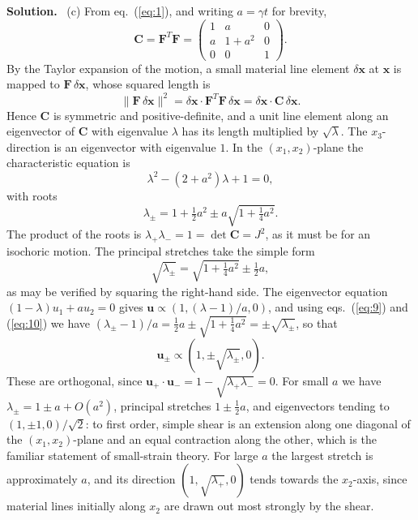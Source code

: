 \documentclass[a4paper,12pt]{paper}
\newenvironment{solution}{\par\noindent\textbf{Solution.}\ }{\par\medskip}
\begin{document}
\begin{solution}
(c) From eq.~(\ref{eq:1}), and writing $a=\gamma t$ for brevity,
\begin{equation}
\mathbf{C}=\mathbf{F}^{T}\mathbf{F}=\begin{pmatrix}1&a&0\\a&1+a^{2}&0\\0&0&1\end{pmatrix}.
\label{eq:6}
\end{equation}
By the Taylor expansion of the motion, a small material line element $\delta\mathbf{x}$ at
$\mathbf{x}$ is mapped to $\mathbf{F}\,\delta\mathbf{x}$, whose squared length is
\begin{equation}
\|\mathbf{F}\,\delta\mathbf{x}\|^{2}=\delta\mathbf{x}\cdot\mathbf{F}^{T}\mathbf{F}\,\delta\mathbf{x}
=\delta\mathbf{x}\cdot\mathbf{C}\,\delta\mathbf{x}.
\label{eq:7}
\end{equation}
Hence $\mathbf{C}$ is symmetric and positive-definite, and a unit line element along an
eigenvector of $\mathbf{C}$ with eigenvalue $\lambda$ has its length multiplied by
$\sqrt{\lambda}$. The $x_{3}$-direction is an eigenvector with eigenvalue $1$. In the
$(x_{1},x_{2})$-plane the characteristic equation is
\begin{equation}
\lambda^{2}-(2+a^{2})\lambda+1=0,
\label{eq:8}
\end{equation}
with roots
\begin{equation}
\lambda_{\pm}=1+\tfrac{1}{2}a^{2}\pm a\sqrt{1+\tfrac{1}{4}a^{2}}.
\label{eq:9}
\end{equation}
The product of the roots is $\lambda_{+}\lambda_{-}=1=\det\mathbf{C}=J^{2}$, as it must be for
an isochoric motion. The principal stretches take the simple form
\begin{equation}
\sqrt{\lambda_{\pm}}=\sqrt{1+\tfrac{1}{4}a^{2}}\pm\tfrac{1}{2}a,
\label{eq:10}
\end{equation}
as may be verified by squaring the right-hand side. The eigenvector equation
$(1-\lambda)u_{1}+au_{2}=0$ gives $\mathbf{u}\propto(1,(\lambda-1)/a,0)$, and using
eqs.~(\ref{eq:9}) and (\ref{eq:10}) we have
$(\lambda_{\pm}-1)/a=\tfrac{1}{2}a\pm\sqrt{1+\tfrac{1}{4}a^{2}}=\pm\sqrt{\lambda_{\pm}}$, so
that
\begin{equation}
\mathbf{u}_{\pm}\propto(1,\pm\sqrt{\lambda_{\pm}},0).
\label{eq:11}
\end{equation}
These are orthogonal, since $\mathbf{u}_{+}\cdot\mathbf{u}_{-}=1-\sqrt{\lambda_{+}\lambda_{-}}=0$.
For small $a$ we have $\lambda_{\pm}=1\pm a+O(a^{2})$, principal stretches $1\pm\tfrac{1}{2}a$,
and eigenvectors tending to $(1,\pm1,0)/\sqrt{2}$: to first order, simple shear is an extension
along one diagonal of the $(x_{1},x_{2})$-plane and an equal contraction along the other, which
is the familiar statement of small-strain theory. For large $a$ the largest stretch is
approximately $a$, and its direction $(1,\sqrt{\lambda_{+}},0)$ tends towards the
$x_{2}$-axis, since material lines initially along $x_{2}$ are drawn out most strongly by the
shear.
\end{solution}
\end{document}
